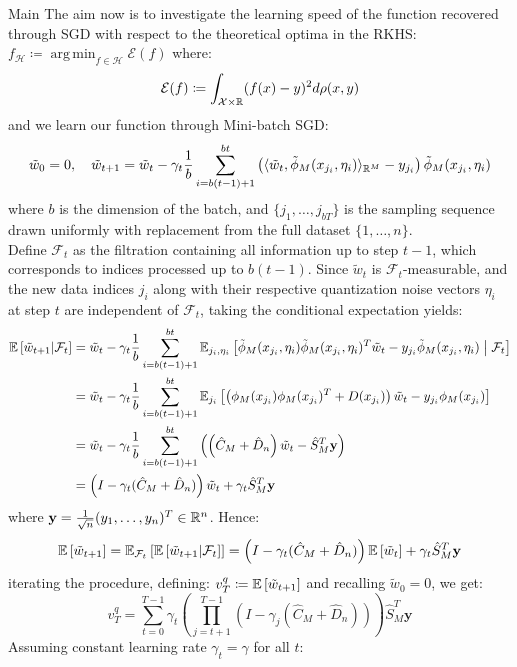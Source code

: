 \begin{chapter}{Main}
 \newpage
 The aim now is to investigate the learning speed of the function recovered through SGD with respect to the theoretical optima in the RKHS: $f_{\mathcal{H}} \coloneqq \operatorname{arg\,min}_{f \in \mathcal{H}}\mathcal{E}(f)$ where:
 $$
     \mathcal{E}(f) \coloneqq \int_{\mathcal{X}\times \mathbb{R}}(f(x)-y)^2d\rho(x, y)
 $$
 and we learn our function through Mini-batch SGD:
 $$
     \tilde{w}_0 = 0, \quad \tilde{w}_{t+1} = \tilde{w}_t - \gamma_t \frac{1}{b} \sum_{i=b(t-1)+1}^{bt} \left( \langle \tilde{w}_t, \tilde{\phi}_M(x_{j_i}, \eta_i) \rangle_{\mathbb{R}^M} - y_{j_i} \right) \tilde{\phi}_M(x_{j_i}, \eta_i)
 $$
 where $b$ is the dimension of the batch, and $\{j_1, \dots, j_{bT}\}$ is the sampling sequence drawn uniformly with replacement from the full dataset $\{1, \dots, n\}$. \\

 Define $\mathcal{F}_t$ as the filtration containing all information up to step $t-1$, which corresponds to indices processed up to $b(t-1)$. Since $\tilde{w}_t$ is $\mathcal{F}_t$-measurable, and the new data indices $j_i$ along with their respective quantization noise vectors $\eta_i$ at step $t$ are independent of $\mathcal{F}_t$, taking the conditional expectation yields:
 \begin{align*}
     \mathbb{E}\left[\tilde{w}_{t+1}\middle|\mathcal{F}_t\right] & = \tilde{w}_t - \gamma_t \frac{1}{b} \sum_{i=b(t-1)+1}^{bt} \mathbb{E}_{j_i, \eta_i} \left[ \tilde{\phi}_M(x_{j_i}, \eta_i)\tilde{\phi}_M(x_{j_i}, \eta_i)^T \tilde{w}_t - y_{j_i}\tilde{\phi}_M(x_{j_i}, \eta_i) \;\middle|\; \mathcal{F}_t \right] \\
                                                         & = \tilde{w}_t - \gamma_t \frac{1}{b} \sum_{i=b(t-1)+1}^{bt} \mathbb{E}_{j_i} \left[ \left( \phi_M(x_{j_i})\phi_M(x_{j_i})^T + D(x_{j_i}) \right) \tilde{w}_t - y_{j_i}\phi_M(x_{j_i}) \right]                                                        \\
                                                         & = \tilde{w}_t - \gamma_t \frac{1}{b} \sum_{i=b(t-1)+1}^{bt} \left( \left(\hat{C}_M + \hat{D}_n\right) \tilde{w}_t - \hat{S}_M^T \mathbf{y} \right)                                                                                           \\
                                                         & = \left(I - \gamma_t (\hat{C}_M + \hat{D}_n)\right)\tilde{w}_t + \gamma_t \hat{S}_M^T \mathbf{y}
 \end{align*}
 where $\mathbf{y} = \frac{1}{\sqrt{n}}(y_1, \dots, y_n)^T \in \mathbb{R}^n$.
 Hence:
 $$
     \mathbb{E}\left[\tilde{w}_{t+1}\right] = \mathbb{E}_{\mathcal{F}_t}\left[\mathbb{E}\left[\tilde{w}_{t+1}|\mathcal{F}_t\right]\right] = \left(I - \gamma_t (\hat{C}_M + \hat{D}_n)\right)\mathbb{E}\left[\tilde{w}_t\right] + \gamma_t \hat{S}_M^T \mathbf{y}
 $$
 iterating the procedure, defining: $v_T^q \coloneqq \mathbb{E}\left[\tilde{w}_{t+1}\right]$ and recalling $\tilde{w}_0 = 0$, we get:
 $$
     v_T^q = \sum_{t=0}^{T-1} \gamma_t \left(\prod_{j=t+1}^{T-1} (I - \gamma_j (\hat{C}_M + \hat{D}_n))\right) \hat{S}_M^T \mathbf{y}
 $$
 Assuming constant learning rate $\gamma_t = \gamma$ for all $t$:


\end{chapter}
